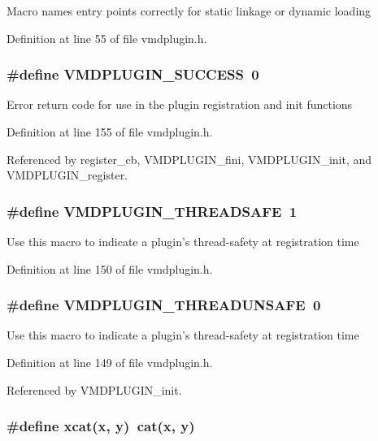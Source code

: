 Macro names entry points correctly for static linkage or dynamic loading 

Definition at line 55 of file vmdplugin.h.
\subsubsection{\setlength{\rightskip}{0pt plus 5cm}\#define VMDPLUGIN\_\-SUCCESS\ 0}\label{vmdplugin_8h_a13}


Error return code for use in the plugin registration and init functions 

Definition at line 155 of file vmdplugin.h.

Referenced by register\_\-cb, VMDPLUGIN\_\-fini, VMDPLUGIN\_\-init, and VMDPLUGIN\_\-register.
\subsubsection{\setlength{\rightskip}{0pt plus 5cm}\#define VMDPLUGIN\_\-THREADSAFE\ 1}\label{vmdplugin_8h_a12}


Use this macro to indicate a plugin's thread-safety at registration time 

Definition at line 150 of file vmdplugin.h.
\subsubsection{\setlength{\rightskip}{0pt plus 5cm}\#define VMDPLUGIN\_\-THREADUNSAFE\ 0}\label{vmdplugin_8h_a11}


Use this macro to indicate a plugin's thread-safety at registration time 

Definition at line 149 of file vmdplugin.h.

Referenced by VMDPLUGIN\_\-init.
\subsubsection{\setlength{\rightskip}{0pt plus 5cm}\#define xcat(x, y)\ cat(x, y)}\label{vmdplugin_8h_a1}


